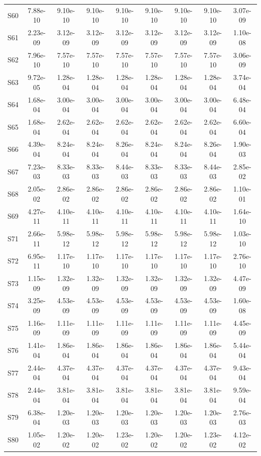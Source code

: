 {\begin{longtable}{l S[table-format=1.2e+2] S[table-format=1.2e+2] S[table-format=1.2e+2] S[table-format=1.2e+2] S[table-format=1.2e+2] S[table-format=1.2e+2] S[table-format=1.2e+2] S[table-format=1.2e+2]}
S60 & 7.88e-10 & 9.10e-10 & 9.10e-10 & 9.10e-10 & 9.10e-10 & 9.10e-10 & 9.10e-10 & 3.07e-09 \\
S61 & 2.23e-09 & 3.12e-09 & 3.12e-09 & 3.12e-09 & 3.12e-09 & 3.12e-09 & 3.12e-09 & 1.10e-08 \\
S62 & 7.96e-10 & 7.57e-10 & 7.57e-10 & 7.57e-10 & 7.57e-10 & 7.57e-10 & 7.57e-10 & 3.06e-09 \\
S63 & 9.72e-05 & 1.28e-04 & 1.28e-04 & 1.28e-04 & 1.28e-04 & 1.28e-04 & 1.28e-04 & 3.74e-04 \\
S64 & 1.68e-04 & 3.00e-04 & 3.00e-04 & 3.00e-04 & 3.00e-04 & 3.00e-04 & 3.00e-04 & 6.48e-04 \\
S65 & 1.68e-04 & 2.62e-04 & 2.62e-04 & 2.62e-04 & 2.62e-04 & 2.62e-04 & 2.62e-04 & 6.60e-04 \\
S66 & 4.39e-04 & 8.24e-04 & 8.24e-04 & 8.26e-04 & 8.24e-04 & 8.24e-04 & 8.26e-04 & 1.90e-03 \\
S67 & 7.23e-03 & 8.33e-03 & 8.33e-03 & 8.44e-03 & 8.33e-03 & 8.33e-03 & 8.44e-03 & 2.85e-02 \\
S68 & 2.05e-02 & 2.86e-02 & 2.86e-02 & 2.86e-02 & 2.86e-02 & 2.86e-02 & 2.86e-02 & 1.10e-01 \\
S69 & 4.27e-11 & 4.10e-11 & 4.10e-11 & 4.10e-11 & 4.10e-11 & 4.10e-11 & 4.10e-11 & 1.64e-10 \\
S71 & 2.66e-11 & 5.98e-12 & 5.98e-12 & 5.98e-12 & 5.98e-12 & 5.98e-12 & 5.98e-12 & 1.03e-10 \\
S72 & 6.95e-11 & 1.17e-10 & 1.17e-10 & 1.17e-10 & 1.17e-10 & 1.17e-10 & 1.17e-10 & 2.76e-10 \\
S73 & 1.15e-09 & 1.32e-09 & 1.32e-09 & 1.32e-09 & 1.32e-09 & 1.32e-09 & 1.32e-09 & 4.47e-09 \\
S74 & 3.25e-09 & 4.53e-09 & 4.53e-09 & 4.53e-09 & 4.53e-09 & 4.53e-09 & 4.53e-09 & 1.60e-08 \\
S75 & 1.16e-09 & 1.11e-09 & 1.11e-09 & 1.11e-09 & 1.11e-09 & 1.11e-09 & 1.11e-09 & 4.45e-09 \\
S76 & 1.41e-04 & 1.86e-04 & 1.86e-04 & 1.86e-04 & 1.86e-04 & 1.86e-04 & 1.86e-04 & 5.44e-04 \\
S77 & 2.44e-04 & 4.37e-04 & 4.37e-04 & 4.37e-04 & 4.37e-04 & 4.37e-04 & 4.37e-04 & 9.43e-04 \\
S78 & 2.44e-04 & 3.81e-04 & 3.81e-04 & 3.81e-04 & 3.81e-04 & 3.81e-04 & 3.81e-04 & 9.59e-04 \\
S79 & 6.38e-04 & 1.20e-03 & 1.20e-03 & 1.20e-03 & 1.20e-03 & 1.20e-03 & 1.20e-03 & 2.76e-03 \\
S80 & 1.05e-02 & 1.20e-02 & 1.20e-02 & 1.23e-02 & 1.20e-02 & 1.20e-02 & 1.23e-02 & 4.12e-02 \\

\end{longtable}}
